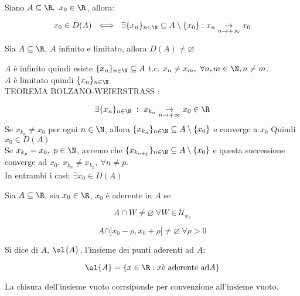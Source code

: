 \documentclass[../analisi.tex]{subfiles}
\begin{document}
\begin{defn} 
Siano $ \acr,\ x_0 \in \R$, allora:


\begin{equation}
	x_0 \in D(A)\ \iff\ \exists \{ x_n \}_{n \in \N} \subseteq A
	\setminus \{ x_0 \}: x_n \underset{\nti}{\to} x_0
\end{equation}

\end{defn}

\begin{defn}
Sia $ \acr $, $A$ infinito e limitato, allora $D(A) \neq \varnothing$ 
\end{defn}

\begin{dimo}
	$A$ è infinito quindi esiste $\{ x_n \}_{n \in \N} \subseteq A$ t.c. 
	$x_n \neq x_m, \ \forall n,m \in \N, n \neq m$.\\
	$A$ è limitato quindi $ \{ x_n \}_{n \in \N}$\\
	 TEOREMA BOLZANO-WEIERSTRASS : 
	
	
	\begin{equation}
		\exists \{ x_n \}_{n \in \N}\ :\ x_{k_n} 
		\underset{\nti}{\to} x_0 \in \R
	\end{equation}
	Se $ x_{k_n} \neq x_0$ per ogni $ n \in \N$, allora 
	$\{ x_{k_n} \}_{n \in \N} \subseteq A \setminus \{x_0\}$ e converge a $x_0$
	Quindi $ x_0 \in D(A) $\\
	Se $ x_{k_p} = x_0,\ p \in \N$, avremo che 
	$\{ x_{k_{n + p}}  \}_{n \in \N} \subseteq A \setminus \{ x_0 \}$ e 
	questa successione converge ad $x_0$. 
	$x_{k_n} \neq x_{k_p},\ \forall n \neq p$.\\
	In entrambi i casi: $ \exists x_0 \in D(A)$
\end{dimo}


\begin{defn}
Sia $\acr$, sia $x_0 \in \R$, $x_0$ è aderente in $A$ se 


\begin{equation}
	A \cap W \neq \varnothing\ \forall W \in \mathcal{U}_{x_0}
\end{equation}
\bda


\begin{equation}
	A \cap ] x_0 - \rho, x_0 + \rho [ \neq \varnothing\ \forall \rho > 0
\end{equation}
\end{defn}


\begin{defn}[Chiusura]
Si dice  di $A$, $\ol{A}$, l'insieme dei punti aderenti ad $A$:


\begin{equation}
	\ol{A} = \{ x \in \R: x \mbox{è aderente ad} A \}
\end{equation}
\end{defn}
La chisura dell'insieme vuoto corrsiponde per convenzione all'insieme vuoto.
\end{document}
